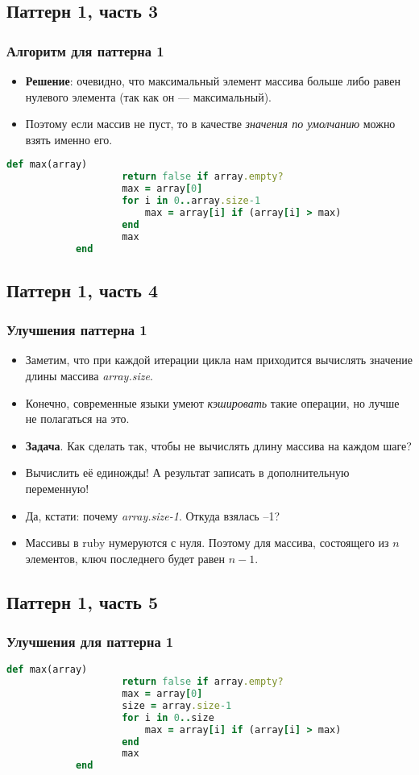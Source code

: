 \documentclass[compress,red]{beamer}
\begin{document}
\subsection{Паттерн 1, часть 3}
\begin{frame}[fragile]
\frametitle{Алгоритм для паттерна 1}
	\begin{itemize}
		\item \textbf{Решение}: очевидно, что максимальный элемент массива больше либо равен нулевого элемента (так как он --- максимальный).
		\item Поэтому если массив не пуст, то в качестве \emph{значения по умолчанию} можно взять именно его.
	\end{itemize}
		\scriptsize{
	  \begin{lstlisting}[label=ruby1,language=Ruby,caption=Паттерн 1]
			def max(array)
				 	return false if array.empty?
				 	max = array[0]
				 	for i in 0..array.size-1
				 	 	max = array[i] if (array[i] > max)
				 	end
				 	max
			end
	  \end{lstlisting}
		}
\end{frame}

\subsection{Паттерн 1, часть 4}
\begin{frame}[fragile]
\frametitle{Улучшения паттерна 1}
	\begin{itemize}
		\item Заметим, что при каждой итерации цикла нам приходится вычислять значение длины массива \emph{array.size}.
		\item Конечно, современные языки умеют \emph{кэшировать} такие операции, но лучше не полагаться на это.
		\item \textbf{Задача}. Как сделать так, чтобы не вычислять длину массива на каждом шаге?
		\item Вычислить её единожды! А результат записать в дополнительную переменную!
		\item Да, кстати: почему \emph{array.size-1}. Откуда взялась --1?
		\item Массивы в ruby нумеруются с нуля. Поэтому для массива, состоящего из $n$ элементов, ключ последнего будет равен $n-1$.
	\end{itemize}
\end{frame}

\subsection{Паттерн 1, часть 5}
\begin{frame}[fragile]
\frametitle{Улучшения для паттерна 1}
		\scriptsize{
	  \begin{lstlisting}[label=ruby2,language=Ruby,caption=Паттерн 1]
			def max(array)
				 	return false if array.empty?
				 	max = array[0]
				 	size = array.size-1
				 	for i in 0..size
				 	 	max = array[i] if (array[i] > max)
				 	end
				 	max
			end
	  \end{lstlisting}
		}
\end{frame}
\end{document}
